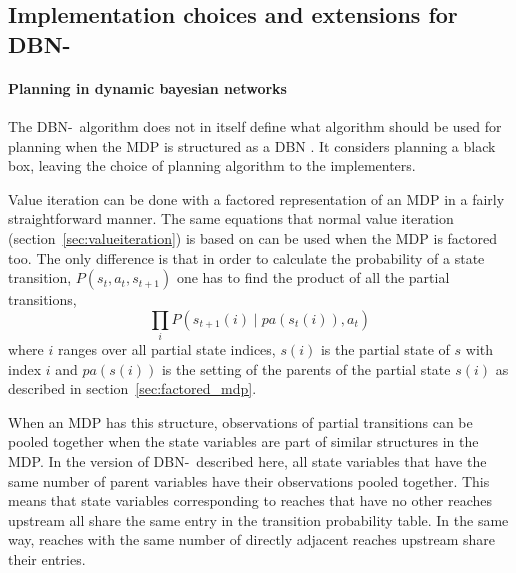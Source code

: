 \subsection{Implementation choices and extensions for DBN-\etre}
\label{sec:e3_our_contribution}

\paragraph{Planning in dynamic bayesian networks}

The DBN-\etre\ algorithm does not in itself define what algorithm should be
used for planning when the MDP is structured as a DBN
\parencite{kearns1999efficient}. It considers planning a black box, leaving the
choice of planning algorithm to the implementers. 

Value iteration can be done with a factored representation of an MDP in a
fairly straightforward manner. The same equations that normal value iteration
(section~\ref{sec:valueiteration}) is based on can be used when the MDP is
factored too. The only difference is that in order to calculate the probability
of a state transition, $P(s_t, a_t, s_{t+1})$ one has to find the product of all the
partial transitions,
\begin{equation}
\prod\limits _{i} P\left(s_{t+1}(i) \mid pa(s_t(i)), a_t\right)
\end{equation}
where $i$ ranges over all partial state indices, $s(i)$ is the partial state of
$s$ with index $i$ and $pa(s(i))$ is the setting of the parents of the partial
state $s(i)$ as described in section~\ref{sec:factored_mdp}.

When an MDP has this structure, observations of partial transitions can be
pooled together when the state variables are part of similar structures in the
MDP. In the version of DBN-\etre\ described here, all state variables that have
the same number of parent variables have their observations pooled together. 
This means that state variables corresponding to reaches that have no other 
reaches upstream all share the same entry in the transition probability table. 
In the same way, reaches with the same number of directly adjacent reaches
upstream share their entries. 



